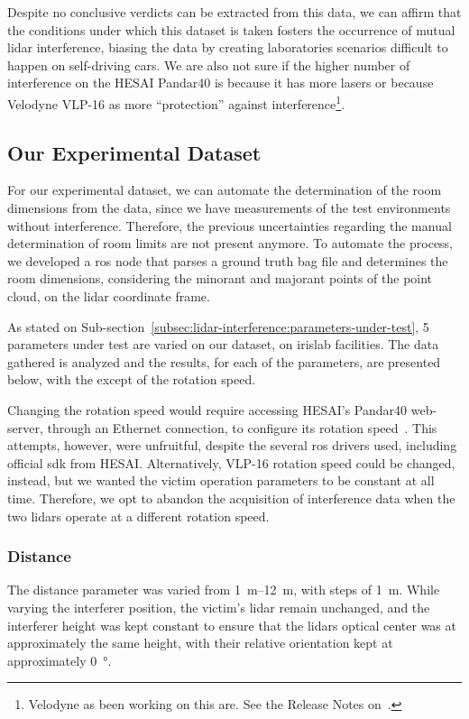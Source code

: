 Despite no conclusive verdicts can be extracted from this data, we can affirm that the conditions under which this dataset is taken fosters the occurrence of mutual \ac{lidar} interference, biasing the data by creating laboratories scenarios difficult to happen on self-driving cars. We are also not sure if the higher number of interference on the HESAI Pandar40 is because it has more lasers or because Velodyne VLP-16 as more ``protection'' against interference\footnote{Velodyne as been working on this are. See the Release Notes on~\cite{vlp16}.}. 

\subsection{Our Experimental Dataset}
\label{subsec:lidar-interference:room-outliers-experimental-setup}
For our experimental dataset, we can automate the determination of the room dimensions from the data, since we have measurements of the test environments without interference. Therefore, the previous uncertainties regarding the manual determination of room limits are not present anymore. To automate the process, we developed a \ac{ros} node that parses a ground truth bag file and determines the room dimensions, considering the minorant and majorant points of the point cloud, on the \ac{lidar} coordinate frame. 

As stated on Sub-section~\ref{subsec:lidar-interference:parameters-under-test}, 5 parameters under test are varied on our dataset, on \ac{irislab} facilities. The data gathered is analyzed and the results, for each of the parameters, are presented below, with the except of the rotation speed.


Changing the rotation speed would require accessing HESAI's Pandar40 web-server, through an Ethernet connection, to configure its rotation speed~\cite{Pandar40UserGuide}. This attempts, however, were unfruitful, despite the several \ac{ros} drivers used, including official \ac{sdk} from HESAI\cp. Alternatively, VLP-16 rotation speed could be changed, instead, but we wanted the victim operation parameters to be constant at all time. Therefore, we opt to abandon the acquisition of interference data when the two \acp{lidar} operate at a different rotation speed.

\subsubsection{Distance}
The distance parameter was varied from \SIrange{1}{12}{\meter}, with steps of \SI{1}{\meter}. While varying the interferer position, the victim's \ac{lidar} remain unchanged, and the interferer height was kept constant to ensure that the \acp{lidar} optical center was at approximately the same height, with their relative orientation kept at approximately \SI{0}{\degree}.

